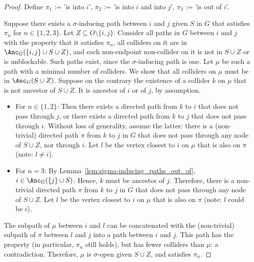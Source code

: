 \begin{proof}
  Define $\pi_1$ := 'is into $i$', $\pi_2$ := 'is into $i$ and into $j$', $\pi_3$ := 'is out of $i$'.

  Suppose there exists a $\sigma$-inducing path between $i$ and $j$ given $S$ in $G$ that satisfies $\pi_n$ for $n \in \{1,2,3\}$.
  Let $Z \subseteq O\setminus\{i,j\}$. 
  Consider all paths in $G$ between $i$ and $j$ with the property that it satisfies $\pi_n$, all colliders on it are in $\Anc_{G}(\{i,j\} \cup S \cup Z)$, and each non-endpoint non-collider on it is not in $S \cup Z$ or is unblockable.
  Such paths exist, since the $\sigma$-inducing path is one. 
  Let $\mu$ be such a path with a minimal number of colliders.
  We show that all colliders on $\mu$ must be in $\Anc_{G}(S \cup Z)$. 
  Suppose on the contrary the existence of a collider $k$ on $\mu$ that is not ancestor of $S \cup Z$. 
  It is ancestor of $i$ or of $j$, by assumption.

  \begin{itemize}
    \item For $n\in \{1,2\}$:
  Then there exists a directed path from $k$ to $i$ that does not pass through $j$, or there exists a directed path from $k$ to $j$ that does not pass through $i$.
  Without loss of generality, assume the latter:
  there is a (non-trivial) directed path $\pi$ from $k$ to $j$ in $G$ that does not pass through any node of $S \cup Z$, nor through $i$.
  Let $l$ be the vertex closest to $i$ on $\mu$ that is also on $\pi$ (note: $l \ne i$).
    \item For $n = 3$:
      By Lemma~\ref{lem:sigma-inducing_paths_out_of}, $i \in \Anc_G(\{j\} \cup S)$.
      Hence, $k$ must be ancestor of $j$.
  Therefore, there is a non-trivial directed path $\pi$ from $k$ to $j$ in $G$ that does not pass through any node of $S \cup Z$.
  Let $l$ be the vertex closest to $i$ on $\mu$ that is also on $\pi$ (note: $l$ could be $i$).
  \end{itemize}

  The subpath of $\mu$ between $i$ and $l$ can be concatenated with the (non-trivial) subpath of $\pi$ between $l$ and $j$ into a path between $i$ and $j$.
  This path has the property (in particular, $\pi_n$ still holds), but has fewer colliders than $\mu$: a contradiction.
  Therefore, $\mu$ is $\sigma$-open given $S \cup Z$, and satisfies $\pi_n$.
\end{proof}
